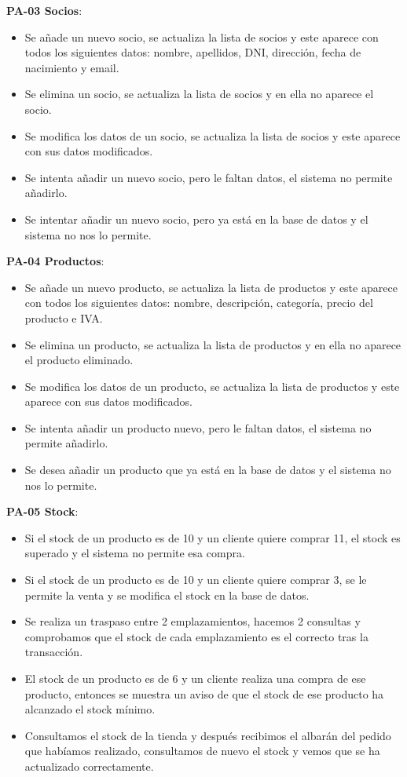 \textbf{PA-03 Socios}:
\begin{itemize}
	\item Se añade un nuevo socio, se actualiza la lista de socios y este aparece con todos los siguientes datos: nombre, apellidos, DNI, dirección, fecha de nacimiento y email.
	\item Se elimina un socio, se actualiza la lista de socios y en ella no aparece el socio.
	\item Se modifica los datos de un socio, se actualiza la lista de socios y este aparece con sus datos modificados.
	\item Se intenta añadir un nuevo socio, pero le faltan datos, el sistema no permite añadirlo.
	\item Se intentar añadir un nuevo socio, pero ya está en la base de datos y el sistema no nos lo permite.
\end{itemize}

\textbf{PA-04 Productos}:
\begin{itemize}
	\item Se añade un nuevo producto, se actualiza la lista de productos y este aparece con todos los siguientes datos: nombre, descripción, categoría, precio del producto e IVA.
	\item Se elimina un producto, se actualiza la lista de productos y en ella no aparece el producto eliminado.
	\item Se modifica los datos de un producto, se actualiza la lista de productos y este aparece con sus datos modificados.
	\item Se intenta añadir un producto nuevo, pero le faltan datos, el sistema no permite añadirlo.
	\item Se desea añadir un producto que ya está en la base de datos y el sistema no nos lo permite.
\end{itemize}

\textbf{PA-05 Stock}:
\begin{itemize}
	\item Si el stock de un producto es de 10 y un cliente quiere comprar 11, el stock es superado y el sistema no permite esa compra.
	\item Si el stock de un producto es de 10 y un cliente quiere comprar 3, se le permite la venta y se modifica el stock en la base de datos.
	\item Se realiza un traspaso entre 2 emplazamientos, hacemos 2 consultas y comprobamos que el stock de cada emplazamiento es el correcto tras la transacción.
	\item El stock de un producto es de 6 y un cliente realiza una compra de ese producto, entonces se muestra un aviso de que el stock de ese producto ha alcanzado el stock mínimo.
	\item Consultamos el stock de la tienda y después recibimos el albarán del pedido que habíamos realizado, consultamos de nuevo el stock y vemos que se ha actualizado correctamente.
\end{itemize}

